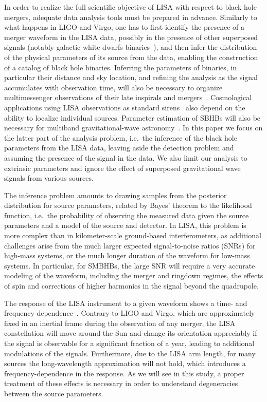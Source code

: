 \documentclass[aps,showpacs,twocolumn,prd,superscriptaddress,nofootinbib]{revtex4-1}
\begin{document}
In order to realize the full scientific objective of LISA with respect to black hole mergers, adequate data analysis tools must be prepared in advance. Similarly to what happens in LIGO and Virgo, one has to first identify the presence of a merger waveform in the LISA data, possibly in the presence of other superposed signals (notably galactic white dwarfs binaries~\cite{Nelemans+01}), and then infer the distribution of the physical parameters of its source from the data, enabling the construction of a catalog of black hole binaries. Inferring the parameters of binaries, in particular their distance and sky location, and refining the analysis as the signal accumulates with observation time, will also be necessary to organize multimessenger observations of their late inspirals and mergers~\cite{ArmitageNatarajan02, DalCanton+19}. Cosmological applications using LISA observations as standard sirens~\cite{Schutz86, Tamanini+16} also depend on the ability to localize individual sources. Parameter estimation of SBHBs will also be necessary for multiband gravitational-wave astronomy~\cite{Sesana16}. In this paper we focus on the latter part of the analysis problem, i.e.~the inference of the black hole parameters from the LISA data, leaving aside the detection problem and assuming the presence of the signal in the data. We also limit our analysis to extrinsic parameters and ignore the effect of superposed gravitational wave signals from various sources.

The inference problem amounts to drawing samples from the posterior distribution for source parameters, related by Bayes' theorem to the likelihood function, i.e.~the probability of observing the measured data given the source parameters and a model of the source and detector. In LISA, this problem is more complex than in kilometer-scale ground-based interferometers, as additional challenges arise from the much larger expected signal-to-noise ratios (SNRs) for high-mass systems, or the much longer duration of the waveform for low-mass systems. In particular, for SMBHBs, the large SNR will require a very accurate modeling of the waveform, including the merger and ringdown regimes, the effects of spin and corrections of higher harmonics in the signal beyond the quadrupole.

The response of the LISA instrument to a given waveform shows a time- and frequency-dependence~\cite{Cutler97, Larson+99, CR02, MB18}.
Contrary to LIGO and Virgo, which are approximately fixed in an inertial frame during the observation of any merger, the LISA constellation will move around the Sun and change its orientation appreciably if the signal is observable for a significant fraction of a year, leading to additional modulations of the signals. Furthermore, due to the LISA arm length, for many sources the long-wavelength approximation will not hold, which introduces a frequency-dependence in the response. As we will see in this study, a proper treatment of these effects is necessary in order to understand degeneracies between the source parameters.
\end{document}
